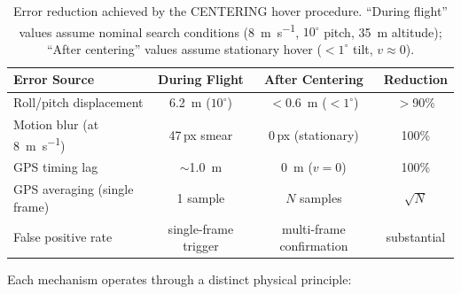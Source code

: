\begin{table}[ht]
  \centering
  \caption{Error reduction achieved by the CENTERING hover procedure.  ``During flight'' values assume nominal search conditions (\SI{8}{\metre\per\second}, $10^{\circ}$ pitch, \SI{35}{\metre} altitude); ``After centering'' values assume stationary hover ($<1^{\circ}$ tilt, $v \approx 0$).}
  \label{tab:centering-reduction}
  \begin{tabular}{lccc}
    \toprule
    \textbf{Error Source} & \textbf{During Flight} & \textbf{After Centering} & \textbf{Reduction} \\
    \midrule
    Roll/pitch displacement          & \SI{6.2}{\metre} ($10^{\circ}$)        & $<$\SI{0.6}{\metre} ($<1^{\circ}$) & $>$90\% \\
    Motion blur (at \SI{8}{\metre\per\second})  & 47\,px smear            & 0\,px (stationary)                  & 100\% \\
    GPS timing lag                   & $\sim$\SI{1.0}{\metre}               & \SI{0}{\metre} ($v = 0$)            & 100\% \\
    GPS averaging (single frame)     & 1 sample                              & $N$ samples                         & $\sqrt{N}$ \\
    False positive rate              & single-frame trigger                   & multi-frame confirmation             & substantial \\
    \bottomrule
  \end{tabular}
\end{table}

\noindent Each mechanism operates through a distinct physical principle:


